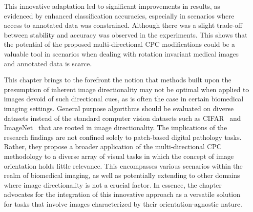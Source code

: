 This innovative adaptation led to significant improvements in results, as evidenced by enhanced classification accuracies, especially in scenarios where access to annotated data was constrained. Although there was a slight trade-off between stability and accuracy was observed in the experiments. This shows that the potential of the proposed multi-directional CPC modifications could be a valuable tool in scenarios when dealing with rotation invariant medical images and annotated data is scarce. 

This chapter brings to the forefront the notion that methods built upon the presumption of inherent image directionality may not be optimal when applied to images devoid of such directional cues, as is often the case in certain biomedical imaging settings. General purpose algorithms should be evaluated on diverse datasets instead of the standard computer vision datasets such as CIFAR~\citep{krizhevsky2009learning} and ImageNet~\citep{deng2009imagenet} that are rooted in image directionality. The implications of the research findings are not confined solely to patch-based digital pathology tasks. Rather, they propose a broader application of the multi-directional CPC methodology to a diverse array of visual tasks in which the concept of image orientation holds little relevance. This encompasses various scenarios within the realm of biomedical imaging, as well as potentially extending to other domains where image directionality is not a crucial factor. In essence, the chapter advocates for the integration of this innovative approach as a versatile solution for tasks that involve images characterized by their orientation-agnostic nature.